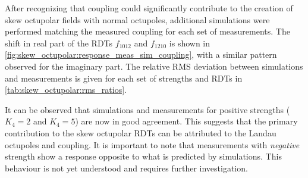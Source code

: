 After recognizing that coupling could significantly contribute to the creation of skew
octupolar fields with normal octupoles, additional simulations were performed matching the measured
coupling for each set of measurements. The shift in real part of the RDTs $f_{1012}$ and $f_{1210}$
is shown in \cref{fig:skew_octupolar:response_meas_sim_coupling}, with a similar pattern observed
for the imaginary part. The relative RMS deviation between simulations and measurements is given
for each set of strengths and RDTs in \cref{tab:skew_octupolar:rms_ratios}.

It can be observed that simulations and measurements for positive strengths ($K_4=2$ and $K_4=5$) 
are now in good agreement. This suggests that the primary contribution to the skew octupolar RDTs
can be attributed to the Landau octupoles and coupling.
It is important to note that measurements with \textit{negative} strength show a response opposite
to what is predicted by simulations. This behaviour is not yet understood and requires further
investigation.

